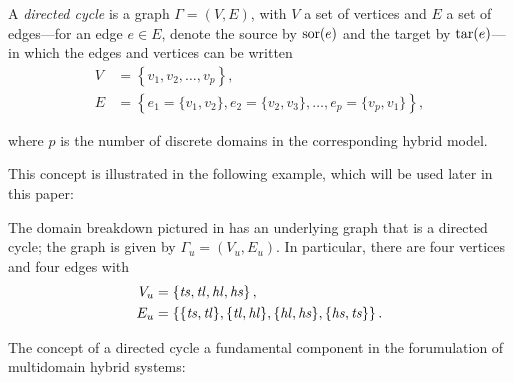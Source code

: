 
\begin{definition}
A {\em directed cycle} is a graph $\Gamma = (V, E)$, with $V$ a set of vertices and $E$ a set of edges---for an edge $e \in E$, denote the source by $\mathrm{sor}(e)$ and the target by $\mathrm{tar}(e)$---in which the edges and vertices can be written
\begin{align}
\label{eqn:directedcyclep}
    V &= \left\{v_{1}, v_{2}, \ldots, v_{p}\right\},\\
    E &= \left\{e_{1} = \{v_{1}, v_{2}\}, e_{2} = \{v_{2}, v_{3}\}, \ldots, e_{p} = \{v_{p}, v_{1}\}\right\},
\end{align}
\end{definition}
where $p$ is the number of discrete domains in the corresponding hybrid model.

This concept is illustrated in the following example, which will be used later in this paper:

\begin{exmp} \label{universalgraph}
The domain breakdown pictured in  has an underlying graph that is a directed cycle; the graph is given by $\Gamma_{u} = (V_{u}, E_{u})$. In particular, there are four vertices and four edges with
\begin{align}
    V_u &= \left\{\mathit{ts}, \mathit{tl}, \mathit{hl}, \mathit{hs}\right\},\\
    E_u &= \left\{\{\mathit{ts}, \mathit{tl}\}, \{\mathit{tl}, \mathit{hl}\}, \{\mathit{hl}, \mathit{hs}\}, \{\mathit{hs}, \mathit{ts}\}\right\}.
\end{align}
\end{exmp}

The concept of a directed cycle a fundamental component in the forumulation of multidomain hybrid systems:

